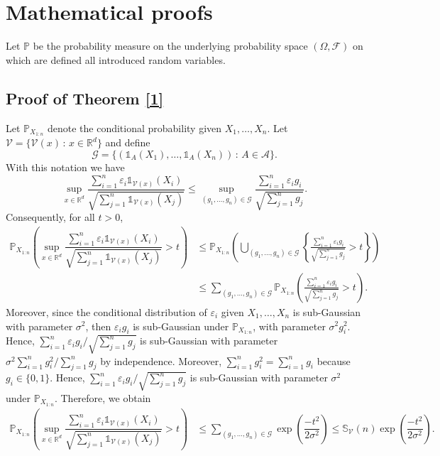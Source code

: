 \documentclass[paper=a4, fontsize=11pt]{scrartcl}
\newcommand{\pr}{\mathbb{P}}
\newcommand{\PP}{\mathbb{P}}
\begin{document}
\section*{Mathematical proofs} 
Let $\PP$ be the probability measure on the underlying probability space $(\Omega, \mathcal F)$ on which are defined all introduced random variables.

\subsection*{Proof of Theorem \ref{1}}

Let \( \mathbb P_{X_{1:n}} \) denote the conditional probability given \( X_1, \dots, X_n \). Let $\mathcal V = \{ \mathcal V (x) \, : \, x\in \mathbb R^d\}$ and define
$$ \mathcal G = \{ (\mathds 1 _{ A }(X_1), \dots,\mathds 1 _{ A}(X_n)) \, :\,  A \in \mathcal{A}  \}.$$
With this notation we have 
$$\sup_{x\in \mathbb R^d} \frac{\sum_{i=1}^n \varepsilon_i \mathds 1 _{ \mathcal V(x) }(X_i)}{\sqrt{\sum_{j=1}^n \mathds 1 _{ \mathcal V(x) }(X_j)}} \leq  \sup_{(g_1,\ldots, g_n) \in \mathcal G } \frac{\sum_{i=1}^n \varepsilon_i g_i }{\sqrt{ \sum_{j=1}^n g_j}}.$$
Consequently, for all $t > 0$,
\begin{align*}
   \pr_{X_{1:n}}\left(\sup_{x\in \mathbb R^d} \dfrac{\sum_{i=1}^n \varepsilon_i \mathds 1 _{ \mathcal V(x) }(X_i)}{\sqrt{\sum_{j=1}^n \mathds 1 _{ \mathcal V(x) }(X_j)}} > t  \right) 
   &\leq \pr_{X_{1:n}}\left( \bigcup_{(g_1,\ldots, g_n) \in \mathcal G }  \left\{  \frac{\sum_{i=1}^n \varepsilon_i g_i }{\sqrt{ \sum_{j=1}^n g_j}} > t \right\}  \right) \\ 
   &\leq \sum_{(g_1,\ldots, g_n) \in \mathcal G } \pr_{X_{1:n}}\left(\frac{\sum_{i=1}^n \varepsilon_i g_i}{\sqrt{ \sum_{j=1}^n g_j}} > t  \right).
\end{align*}
Moreover, since the conditional distribution of $\varepsilon_i$ given $X_1,\ldots,X_n$ is sub-Gaussian with parameter $\sigma^2$, then  $\varepsilon_i g_i$ is sub-Gaussian under $\pr_{X_{1:n}}$, with parameter $\sigma^2 g_i^2$. Hence, ${\sum_{i=1}^n \varepsilon_i g_i}/{\sqrt{ \sum_{j=1}^n g_j}}$ is sub-Gaussian with parameter $\sigma^2 \sum_{i=1}^n g_i^2 / \sum_{j=1}^n g_j$ by independence. Moreover, $\sum_{i=1}^n g_i^2 = \sum_{i=1}^n g_i$ because $g_i\in \{ 0,1\} $. Hence, ${\sum_{i=1}^n \varepsilon_i g_i}/{\sqrt{ \sum_{j=1}^n g_j}}$ is sub-Gaussian with parameter $\sigma^2$ under $\pr_{X_{1:n}}$. Therefore, we obtain
\begin{align*}
    \pr_{X_{1:n}}\left(\sup_{x\in \mathbb R^d} \dfrac{\sum_{i=1}^n \varepsilon_i \mathds 1 _{ \mathcal V(x) }(X_i)}{\sqrt{\sum_{j=1}^n \mathds 1 _{ \mathcal V(x) }(X_j)}} > t  \right)  &\leq \sum_{(g_1,\ldots, g_n) \in \mathcal G } \exp\left( \dfrac{-t^2}{2\sigma^2}\right)  \leq  \mathbb S_\mathcal V(n) \exp\left( \dfrac{-t^2}{2\sigma^2}\right).
\end{align*}
\end{document}
